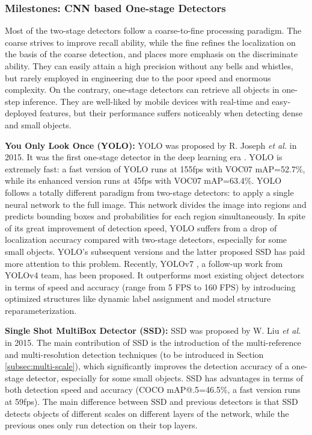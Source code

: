 \documentclass[lettersize,journal]{IEEEtran}
\begin{document}
\subsubsection{Milestones: CNN based One-stage Detectors}

Most of the two-stage detectors follow a coarse-to-fine processing paradigm. The coarse strives to improve recall ability, while the fine refines the localization on the basis of the coarse detection, and places more emphasis on the discriminate ability. They can easily attain a high precision without any bells and whistles, but rarely employed in engineering due to the poor speed and enormous complexity. On the contrary, one-stage detectors can retrieve all objects in one-step inference. They are well-liked by mobile devices with real-time and easy-deployed features, but their performance suffers noticeably when detecting dense and small objects.


\textbf{You Only Look Once (YOLO):}
YOLO was proposed by R. Joseph \emph{et al.} in 2015. It was the first one-stage detector in the deep learning era \cite{CVPR16-YOLO}. YOLO is extremely fast: a fast version of YOLO runs at 155fps with VOC07 mAP=52.7\%, while its enhanced version runs at 45fps with VOC07 mAP=63.4\%.
YOLO follows a totally different paradigm from two-stage detectors: to apply a single neural network to the full image. This network divides the image into regions and predicts bounding boxes and probabilities for each region simultaneously. In spite of its great improvement of detection speed, YOLO suffers from a drop of localization accuracy compared with two-stage detectors, especially for some small objects. YOLO's subsequent versions \cite{CVPR17-YOLOv2, redmon2018yolov3, bochkovskiy2020yolov4} and the latter proposed SSD \cite{ECCV16-SSD} has paid more attention to this problem. Recently, YOLOv7 \cite{wang2022yolov7}, a follow-up work from YOLOv4 team, has been proposed. It outperforms most existing object detectors in terms of speed and accuracy (range from 5 FPS to 160 FPS) by introducing optimized structures like dynamic label assignment and model structure reparameterization.

\textbf{Single Shot MultiBox Detector (SSD):}
SSD \cite{ECCV16-SSD} was proposed by W. Liu \emph{et al.} in 2015. The main contribution of SSD is the introduction of the multi-reference and multi-resolution detection techniques (to be introduced in Section \ref{subsec:multi-scale}), which significantly improves the detection accuracy of a one-stage detector, especially for some small objects. SSD has advantages in terms of both detection speed and accuracy %
(COCO mAP@.5=46.5\%, a fast version runs at 59fps).
The main difference between SSD and previous detectors is that SSD detects objects of different scales on different layers of the network, while the previous ones only run detection on their top layers.
\end{document}
